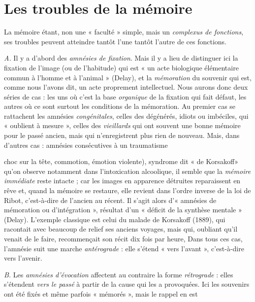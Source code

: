 \section{Les troubles de la mémoire}%
La mémoire étant, non
une « faculté » simple, mais un {\it complexus de fonctions}, ses troubles
peuvent atteindre tantôt l’une tantôt l’autre de ces fonctions.

\vspace{0.24cm}
{\footnotesize 
{\it A.} Il y a d’abord des \textsf{\textit {amnésies de fixation}}. Mais il y a lieu de distinguer ici
la fixation de l’image (ou de l'habitude) qui est « un acte biologique élémentaire
commun à l’homme et à l'animal » (Delay), et la {\it mémoration} du
souvenir qui est, comme nous l'avons dit, un acte proprement intellectuel.
Nous aurons donc deux séries de cas : les uns où c’est la base {\it organique}
de la fixation qui fait défaut, les autres où ce sont surtout les conditions de
la mémoration. Au premier cas se rattachent les amnésies {\it congénitales},
celles des dégénérés, idiots ou imbéciles, qui « oublient à mesure », celles
des {\it vieillards} qui ont souvent une bonne mémoire pour le passé ancien,
mais qui n’enregistrent plus rien de nouveau. Mais, dans d’autres cas : amnésies
consécutives à un traumatisme {choc sur la tête, commotion, émotion
violente), syndrome dit « de Korsakoff» qu’on observe notamment dans
l’intoxication alcoolique, il semble que la {\it mémoire immédiate} reste intacte ;
car les images en apparence détruites reparaissent en rêve et, quand la
mémoire se restaure, elle revient dans l’ordre inverse de la loi de Ribot,
c'est-à-dire de l’ancien au récent. Il s’agit alors d’« amnésies de mémoration
ou d'intégration », résultat d’un « déficit de la synthèse mentale » (Delay).
L'exemple classique est celui du malade de Korsakoff (1889), qui racontait
avec beaucoup de relief ses anciens voyages, mais qui, oubliant qu’il
venait de le faire, recommençait son récit dix fois par heure, Dans tous ces
cas, l’amnésie suit une marche \textsf{\textit {antérograde}} : elle s'étend « vers l’avant »,
c'est-à-dire vers l’avenir.

{\it B.} Les \textsf{\textit {amnésies d’évocation}} affectent au contraire la forme
\textsf{\textit {rétrograde}} : elles
s'étendent {\it vers le passé} à partir de la cause qui les a provoquées. Ici les
souvenirs ont été fixés et même parfois « mémorés », mais le rappel en est

}}
